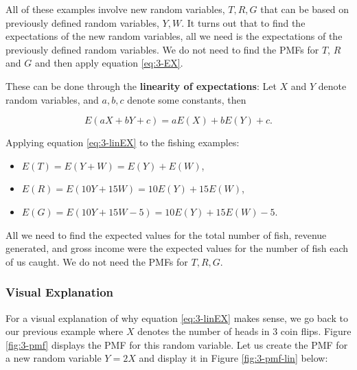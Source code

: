 \documentclass[
]{book}
\providecommand{\tightlist}{%
  \setlength{\itemsep}{0pt}\setlength{\parskip}{0pt}}
\begin{document}
All of these examples involve new random variables, \(T, R, G\) that can be based on previously defined random variables, \(Y, W\). It turns out that to find the expectations of the new random variables, all we need is the expectations of the previously defined random variables. We do not need to find the PMFs for \(T\), \(R\) and \(G\) and then apply equation \eqref{eq:3-EX}.

These can be done through the \textbf{linearity of expectations}: Let \(X\) and \(Y\) denote random variables, and \(a,b,c\) denote some constants, then

\begin{equation} 
E(aX + bY + c) = aE(X) + bE(Y) + c.
\label{eq:3-linEX}
\end{equation}

Applying equation \eqref{eq:3-linEX} to the fishing examples:

\begin{itemize}
\tightlist
\item
  \(E(T) = E(Y + W) = E(Y) + E(W)\),
\item
  \(E(R) = E(10Y + 15W) = 10E(Y) + 15E(W)\),
\item
  \(E(G) = E(10Y + 15W - 5) = 10E(Y) + 15E(W) - 5\).
\end{itemize}

All we need to find the expected values for the total number of fish, revenue generated, and gross income were the expected values for the number of fish each of us caught. We do not need the PMFs for \(T,R,G\).

\hypertarget{visual-explanation}{%
\subsubsection{Visual Explanation}\label{visual-explanation}}

For a visual explanation of why equation \eqref{eq:3-linEX} makes sense, we go back to our previous example where \(X\) denotes the number of heads in 3 coin flips. Figure \ref{fig:3-pmf} displays the PMF for this random variable. Let us create the PMF for a new random variable \(Y=2X\) and display it in Figure \ref{fig:3-pmf-lin} below:
\end{document}
